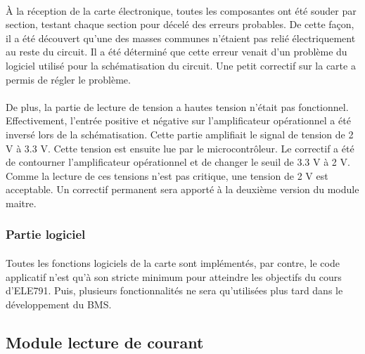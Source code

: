 			\paragraph{}
			À la réception de la carte électronique, toutes les composantes ont été souder par section, testant chaque section pour décelé des erreurs probables. De cette façon, il a été découvert qu’une des masses communes n’étaient pas relié électriquement au reste du circuit. Il a été déterminé que cette erreur venait d’un problème du logiciel utilisé pour la schématisation du circuit. Une petit correctif sur la carte a permis de régler le problème.


			\paragraph{}
			De plus, la partie de lecture de tension a hautes tension n’était pas fonctionnel. Effectivement, l’entrée positive et négative sur l'amplificateur opérationnel a été inversé lors de la schématisation. Cette partie amplifiait le signal de tension de 2 V à 3.3 V. Cette tension est ensuite lue par le microcontrôleur. Le correctif a été de contourner l’amplificateur opérationnel et de changer le seuil de 3.3 V à 2 V. Comme la lecture de ces tensions n’est pas critique, une tension de 2 V est acceptable. Un correctif permanent sera apporté à la deuxième version du module maitre.

		\subsubsection{Partie logiciel}

			\paragraph{}

			Toutes les fonctions logiciels de la carte sont implémentés, par contre, le code applicatif n’est qu’à son stricte minimum pour atteindre les objectifs du cours d’ELE791. Puis, plusieurs fonctionnalités ne sera qu’utilisées plus tard dans le développement du BMS.




	\subsection{Module lecture de courant}

